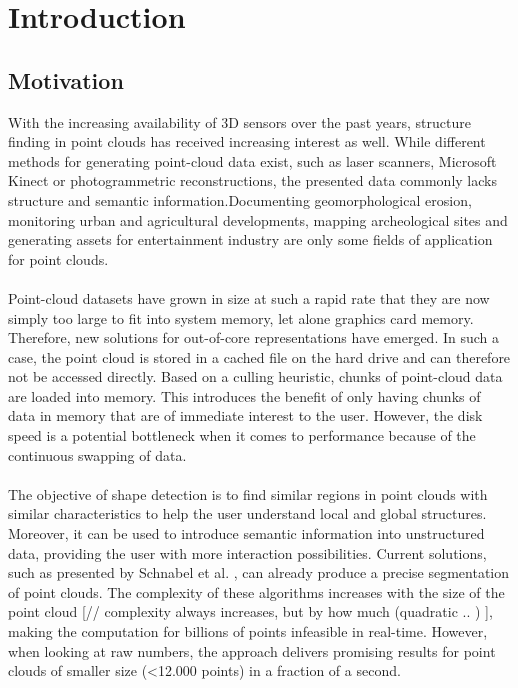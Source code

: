 \chapter{Introduction}

\section{Motivation}

With the increasing availability of 3D sensors over the past years, structure finding in point clouds has received increasing interest as well. While different methods for generating point-cloud data exist, such as laser scanners, Microsoft Kinect or photogrammetric reconstructions, the presented data commonly lacks structure and semantic information.Documenting geomorphological erosion, monitoring urban and agricultural developments, mapping archeological sites and generating assets for entertainment industry are only some fields of application for point clouds. 
\\
\\
Point-cloud datasets have grown in size at such a rapid rate that they are now simply too large to fit into system memory, let alone graphics card memory. Therefore, new solutions for out-of-core representations have emerged. In such a case, the point cloud is stored in a cached file on the hard drive and can therefore not be accessed directly. Based on a culling heuristic, chunks of point-cloud data are loaded into memory. This introduces the benefit of only having chunks of data in memory that are of immediate interest to the user. However, the disk speed is a potential bottleneck when it comes to performance because of the continuous swapping of data.
\\
\\
The objective of shape detection is to find similar regions in point clouds with similar characteristics to help the user understand local and global structures. Moreover, it can be used to introduce semantic information into unstructured data, providing the user with more interaction possibilities. Current solutions, such as presented by Schnabel et al. \cite{schnabel-2007-efficient, schnabel-2007-ransac}, can already produce a precise segmentation of point clouds. The complexity of these algorithms increases with the size of the point cloud [// complexity always increases, but by how much (quadratic .. ) ], making the computation for billions of points infeasible in real-time. However, when looking at raw numbers, the approach delivers promising results for point clouds of smaller size (<12.000 points) in a fraction of a second.
